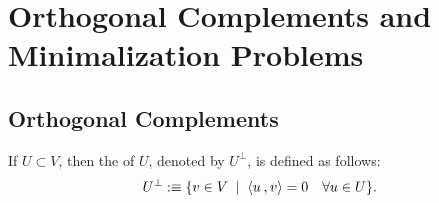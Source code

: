 \section{Orthogonal Complements and Minimalization Problems}
\subsection{Orthogonal Complements}

\begin{mydef}
  If $U\subset V$, then the  of $U$, denoted by $U^{\bot}$, is defined as follows:
  \begin{equation}
    U^{\bot} :\equiv \{v \in V \; \mid \; \ip{u}{v} = 0 \quad \forall u \in U \}.
  \end{equation}
\end{mydef}

